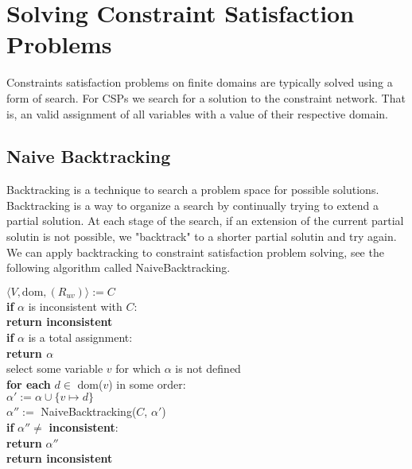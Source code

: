\chapter{Solving Constraint Satisfaction Problems}

Constraints satisfaction problems on finite domains are typically solved using a form of search. For CSPs we search for a solution to the constraint network. That is, an valid assignment of all variables with a value of their respective domain.

\section{Naive Backtracking}

Backtracking is a technique \cite{backtracking:1975} to search a problem space for possible solutions. Backtracking is a way to organize a search by continually trying to extend a partial solution. At each stage of the search, if an extension of the current partial solutin is not possible, we "backtrack" to a shorter partial solutin and try again. We can apply backtracking to constraint satisfaction problem solving, see the following algorithm called NaiveBacktracking. \\

\begin{tcolorbox}[title=function NaiveBacktracking)]
	$\langle V, \text{dom}, (R_{uv})\rangle := C$ \\
	\textbf{if} $\alpha$ is inconsistent with $C$: \\
	\textbf{return inconsistent} \\

	\textbf{if} $\alpha$ is a total assignment: \\
	\textbf{return $\alpha$} \\

	select some variable $v$ for which $\alpha$ is not defined \\
	\textbf{for each} $d \in$ dom($v$) in some order: \\
	$\alpha' := \alpha \cup \{v \mapsto d\}$ \\
	$\alpha'' := $ NaiveBacktracking($C$, $\alpha'$) \\
	\textbf{if} $\alpha'' \neq$ \textbf{inconsistent}: \\
	\textbf{return} $\alpha''$ \\

	\textbf{return inconsistent}
\end{tcolorbox}

